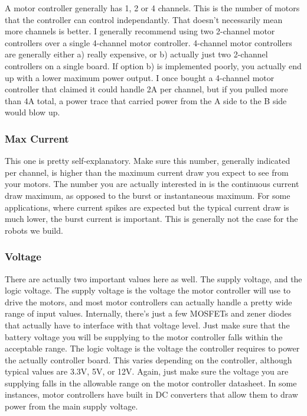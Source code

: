 A motor controller generally has 1, 2 or 4 channels. This is the number of motors that the controller can control independantly. That doesn't necessarily mean more channels is better. I generally recommend using two 2-channel motor controllers over a single 4-channel motor controller. 4-channel motor controllers are generally either a) really expensive, or b) actually just two 2-channel controllers on a single board. If option b) is implemented poorly, you actually end up with a lower maximum power output. I once bought a 4-channel motor controller that claimed it could handle 2A per channel, but if you pulled more than 4A total, a power trace that carried power from the A side to the B side would blow up.

\subsubsection{Max Current}

This one is pretty self-explanatory. Make sure this number, generally indicated per channel, is higher than the maximum current draw you expect to see from your motors. The number you are actually interested in is the continuous current draw maximum, as opposed to the burst or instantaneous maximum. For some applications, where current spikes are expected but the typical current draw is much lower, the burst current is important. This is generally not the case for the robots we build.

\subsubsection{Voltage}

There are actually two important values here as well. The supply voltage, and the logic voltage. The supply voltage is the voltage the motor controller will use to drive the motors, and most motor controllers can actually handle a pretty wide range of input values. Internally, there's just a few MOSFETs and zener diodes that actually have to interface with that voltage level. Just make sure that the battery voltage you will be supplying to the motor controller falls within the acceptable range. The logic voltage is the voltage the controller requires to power the actually controller board. This varies depending on the controller, although typical values are 3.3V, 5V, or 12V. Again, just make sure the voltage you are supplying falls in the allowable range on the motor controller datasheet. In some instances, motor controllers have built in DC converters that allow them to draw power from the main supply voltage.

